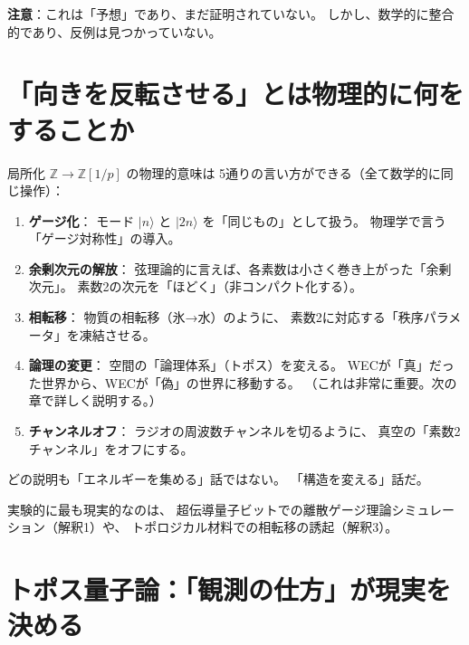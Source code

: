 \documentclass[12pt,a4paper]{article}
\begin{document}
\textbf{注意}：これは「予想」であり、まだ証明されていない。
しかし、数学的に整合的であり、反例は見つかっていない。

\section{「向きを反転させる」とは物理的に何をすることか}

局所化 $\mathbb{Z} \to \mathbb{Z}[1/p]$ の物理的意味は
5通りの言い方ができる（全て数学的に同じ操作）：

\begin{enumerate}[leftmargin=2em]
\item \textbf{ゲージ化}：
  モード $|n\rangle$ と $|2n\rangle$ を「同じもの」として扱う。
  物理学で言う「ゲージ対称性」の導入。

\item \textbf{余剰次元の解放}：
  弦理論的に言えば、各素数は小さく巻き上がった「余剰次元」。
  素数2の次元を「ほどく」（非コンパクト化する）。

\item \textbf{相転移}：
  物質の相転移（氷→水）のように、
  素数2に対応する「秩序パラメータ」を凍結させる。

\item \textbf{論理の変更}：
  空間の「論理体系」（トポス）を変える。
  WECが「真」だった世界から、WECが「偽」の世界に移動する。
  （これは非常に重要。次の章で詳しく説明する。）

\item \textbf{チャンネルオフ}：
  ラジオの周波数チャンネルを切るように、
  真空の「素数2チャンネル」をオフにする。
\end{enumerate}

どの説明も「エネルギーを集める」話ではない。
「構造を変える」話だ。

実験的に最も現実的なのは、
超伝導量子ビットでの離散ゲージ理論シミュレーション（解釈1）や、
トポロジカル材料での相転移の誘起（解釈3）。

\section{トポス量子論：「観測の仕方」が現実を決める}
\label{sec:topos}
\end{document}

